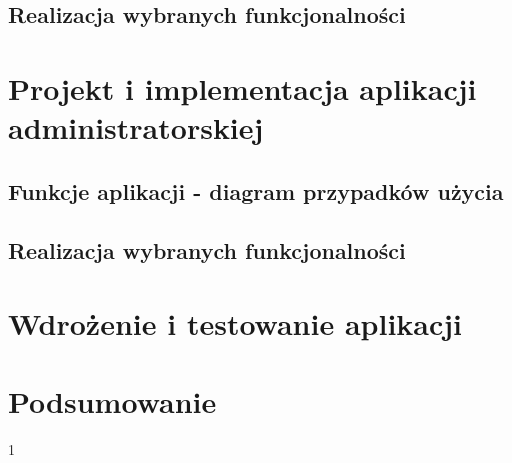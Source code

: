 \documentclass{article}
\begin{document}
	\subsection{Realizacja wybranych funkcjonalności}
	
\section{Projekt i implementacja aplikacji administratorskiej}
	\subsection{Funkcje aplikacji - diagram przypadków użycia}

	\subsection{Realizacja wybranych funkcjonalności}
	
\section{Wdrożenie i testowanie aplikacji}

\section{Podsumowanie}

 
1
 
\end{document}
